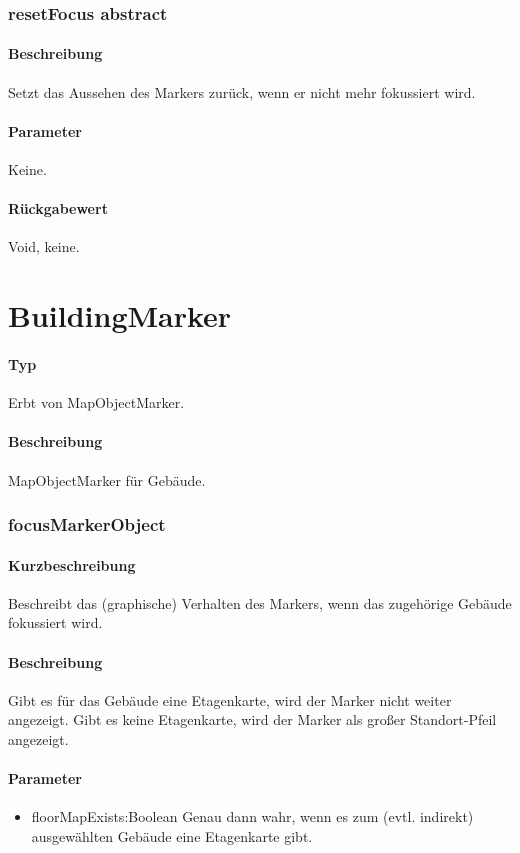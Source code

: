 \subsubsection{resetFocus {abstract}}%
\paragraph*{Beschreibung}
Setzt das Aussehen des Markers zurück, wenn er nicht mehr fokussiert wird.
\paragraph*{Parameter}
Keine.
\paragraph*{Rückgabewert}
Void, keine.


\section{BuildingMarker}
\paragraph*{Typ} 
Erbt von MapObjectMarker.
\paragraph*{Beschreibung}
MapObjectMarker für Gebäude.

\subsubsection{focusMarkerObject}%
\paragraph*{Kurzbeschreibung}
Beschreibt das (graphische) Verhalten des Markers, wenn das zugehörige Gebäude fokussiert wird.
\paragraph*{Beschreibung}
Gibt es für das Gebäude eine Etagenkarte, wird der Marker nicht weiter angezeigt.
Gibt es keine Etagenkarte, wird der Marker als großer Standort-Pfeil angezeigt.
\paragraph*{Parameter}
\begin{itemize}
    \item floorMapExists:Boolean Genau dann wahr, wenn es zum (evtl. indirekt) ausgewählten Gebäude eine Etagenkarte gibt.
\end{itemize}
